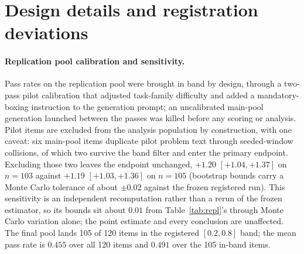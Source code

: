 \documentclass[11pt]{article}
\begin{document}
\section{Design details and registration deviations}
\label{app:details}

\paragraph{Replication pool calibration and sensitivity.}
Pass rates on the replication pool were brought in band by design, through a two-pass pilot calibration that adjusted task-family difficulty and added a mandatory-boxing instruction to the generation prompt; an uncalibrated main-pool generation launched between the passes was killed before any scoring or analysis.
Pilot items are excluded from the analysis population by construction, with one caveat: six main-pool items duplicate pilot problem text through seeded-window collisions, of which two survive the band filter and enter the primary endpoint.
Excluding those two leaves the endpoint unchanged, $+1.20$ $[+1.04, +1.37]$ on $n{=}103$ against $+1.19$ $[+1.03, +1.36]$ on $n{=}105$ (bootstrap bounds carry a Monte Carlo tolerance of about $\pm 0.02$ against the frozen registered run).
This sensitivity is an independent recomputation rather than a rerun of the frozen estimator, so its bounds sit about $0.01$ from Table~\ref{tab:repl}'s through Monte Carlo variation alone; the point estimate and every conclusion are unaffected.
The final pool lands 105 of 120 items in the registered $[0.2, 0.8]$ band; the mean pass rate is $0.455$ over all 120 items and $0.491$ over the 105 in-band items.
\end{document}
